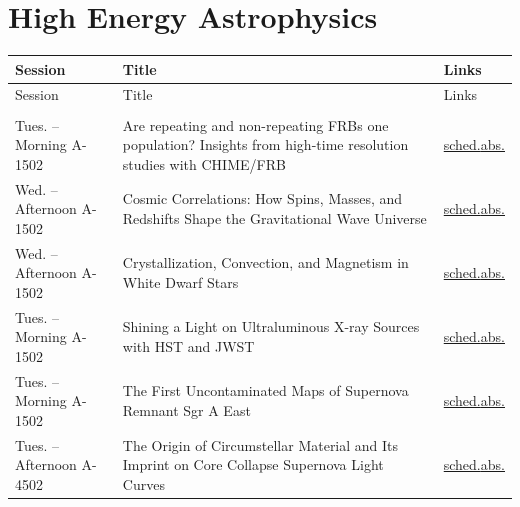 \section*{High Energy Astrophysics}
{\small
\setlength{\emergencystretch}{1em}
\begin{longtable}{@{}>{\TableRaggedRight\arraybackslash\hspace{0pt}}p{} >{\TableRaggedRight\arraybackslash\hspace{0pt}}p{} >{\TableRaggedRight\arraybackslash\hspace{0pt}}p{}@{}}
\toprule
Session & Title & Links \\
\midrule
\endfirsthead
\toprule
Session & Title & Links \\
\midrule
\endhead
\addlinespace[0.15em]
\multicolumn{3}{@{}l}{\sffamily\bfseries\color{cascateal} Talks} \\
\addlinespace[0.1em]
Tues. -- Morning A-1502 & Are repeating and non-repeating FRBs one population? Insights from high-time resolution studies with CHIME/FRB & \hyperlink{schedule-talk-134}{sched.}\newline \hyperlink{abstract-talk-134}{abs.} \\
Wed. -- Afternoon A-1502 & Cosmic Correlations: How Spins, Masses, and Redshifts Shape the Gravitational Wave Universe & \hyperlink{schedule-talk-307}{sched.}\newline \hyperlink{abstract-talk-307}{abs.} \\
Wed. -- Afternoon A-1502 & Crystallization, Convection, and Magnetism in White Dwarf Stars & \hyperlink{schedule-talk-137}{sched.}\newline \hyperlink{abstract-talk-137}{abs.} \\
Tues. -- Morning A-1502 & Shining a Light on Ultraluminous X-ray Sources with HST and JWST & \hyperlink{schedule-talk-117}{sched.}\newline \hyperlink{abstract-talk-117}{abs.} \\
Tues. -- Morning A-1502 & The First Uncontaminated Maps of Supernova Remnant Sgr A East & \hyperlink{schedule-talk-13}{sched.}\newline \hyperlink{abstract-talk-13}{abs.} \\
Tues. -- Afternoon A-4502 & The Origin of Circumstellar Material and Its Imprint on Core Collapse Supernova Light Curves & \hyperlink{schedule-talk-269}{sched.}\newline \hyperlink{abstract-talk-269}{abs.} \\

\end{longtable}}
